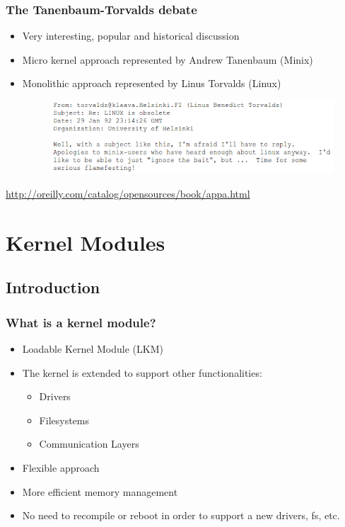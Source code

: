 \documentclass{beamer}
\begin{document}

\begin{frame}
\frametitle{The Tanenbaum-Torvalds debate}

\begin{itemize}
\item Very interesting, popular and historical discussion
\item Micro kernel approach represented by Andrew Tanenbaum (Minix)
\item Monolithic approach represented by Linus Torvalds (Linux)

\begin{figure}
  \centering
	\includegraphics[scale=0.5,clip=true]{figs/Tanenbaum_Linus.png}
  \label{fig:Tanenbaum_Linus}
\end{figure}

\end{itemize}

\begin{center}
{\tiny \url{http://oreilly.com/catalog/opensources/book/appa.html}}
\end{center}

\end{frame}



\section{Kernel Modules}

\subsection{Introduction}

\begin{frame}
\frametitle{What is a kernel module?}

\begin{itemize}
\item Loadable Kernel Module (LKM)
\item The kernel is extended to support other functionalities:
\begin{itemize}
\item Drivers
\item Filesystems
\item Communication Layers
\end{itemize}
\item Flexible approach
\item More efficient memory management
\item No need to recompile or reboot in order to support a new drivers, fs, etc.
\end{itemize}

\end{frame}
\end{document}
